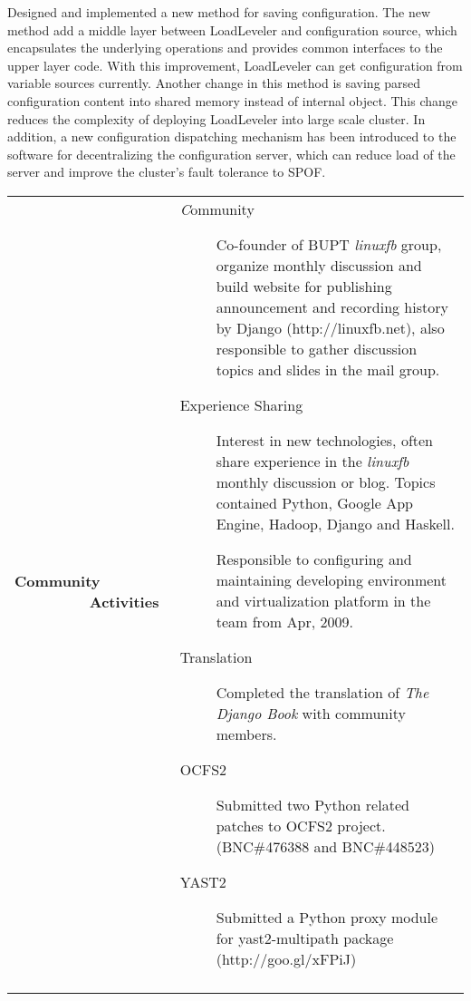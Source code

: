 \documentclass[11pt]{article}
\begin{document}
\begin{description}[leftmargin=\leftskip, labelindent=.12\textwidth]
    \item[{Configuration Enhancement \normalfont(Dec, 2008 - Sep, 2009):}] %
        Designed and implemented a new method for saving configuration.
        The new method add a middle layer between LoadLeveler and configuration source,
        which encapsulates the underlying operations and provides common interfaces to the upper layer code.
        With this improvement, LoadLeveler can get configuration from variable sources currently.
        Another change in this method is saving parsed configuration content into shared memory instead of internal object.
        This change reduces the complexity of deploying LoadLeveler into large scale cluster.
        In addition, a new configuration dispatching mechanism has been introduced to the software for decentralizing the configuration server,
        which can reduce load of the server and improve the cluster's fault tolerance to SPOF.\\
\end{description}
\setlength{\leftskip}{0pt}


\begin{tabularx}{\textwidth}{lX}
    \parbox[t]{.12\textwidth}{\large \bf Community ~~~~~~~~~Activities} & %
        \vspace{-1.7 em} %
        \begin{description}
            \item[\textit{linuxfb} Community]
                Co-founder of BUPT \textit{linuxfb} group,
                organize monthly discussion and build website for publishing announcement and recording history by Django (http://linuxfb.net),
                also responsible to gather discussion topics and slides in the mail group.
            \item[Experience Sharing] Interest in new technologies,
                often share experience in the \textit{linuxfb} monthly discussion or blog.
                Topics contained Python, Google App Engine, Hadoop, Django and Haskell.
            \item[{System Administrator}] %
                Responsible to configuring and maintaining developing environment and virtualization platform in the team from Apr, 2009.
            \item[Translation] Completed the translation of {\it The Django Book} with community members.
            \item[OCFS2] Submitted two Python related patches to OCFS2 project. (BNC\#476388 and BNC\#448523)
            \item[YAST2] Submitted a Python proxy module for yast2-multipath package (http://goo.gl/xFPiJ)
        \end{description}\\\\
\end{tabularx}
\end{document}
